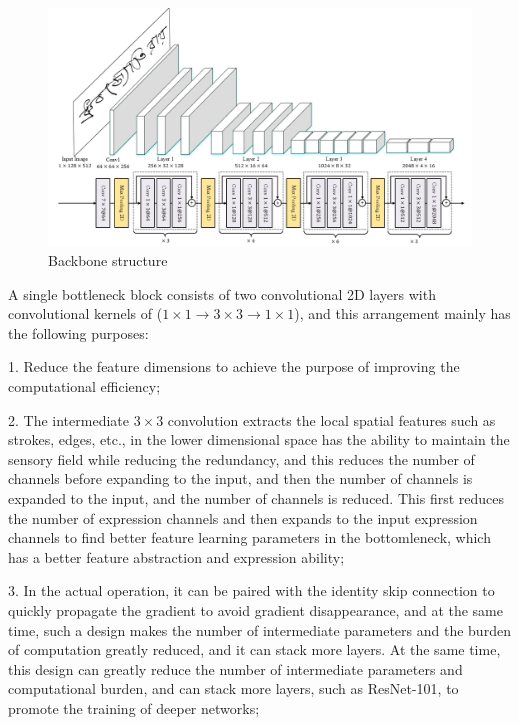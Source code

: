 \begin{figure}[htbp]
  \begin{center}
      \includegraphics[scale=0.45]{figure/backbone.png}
  \end{center}
  \caption{Backbone structure}
  \label{fig:backbone}
\end{figure}

A single bottleneck block consists of two convolutional 2D layers with convolutional kernels of ($1\times 1 \to 3\times 3 \to 1\times 1$), and this arrangement mainly has the following purposes: 

1. Reduce the feature dimensions to achieve the purpose of improving the computational efficiency; 

2. The intermediate $3\times 3$ convolution extracts the local spatial features such as strokes, edges, etc., in the lower dimensional space has the ability to maintain the sensory field while reducing the redundancy, and this reduces the number of channels before expanding to the input, and then the number of channels is expanded to the input, and the number of channels is reduced. This first reduces the number of expression channels and then expands to the input expression channels to find better feature learning parameters in the bottomleneck, which has a better feature abstraction and expression ability; 

3. In the actual operation, it can be paired with the identity skip connection to quickly propagate the gradient to avoid gradient disappearance, and at the same time, such a design makes the number of intermediate parameters and the burden of computation greatly reduced, and it can stack more layers. At the same time, this design can greatly reduce the number of intermediate parameters and computational burden, and can stack more layers, such as ResNet-101, to promote the training of deeper networks; 

